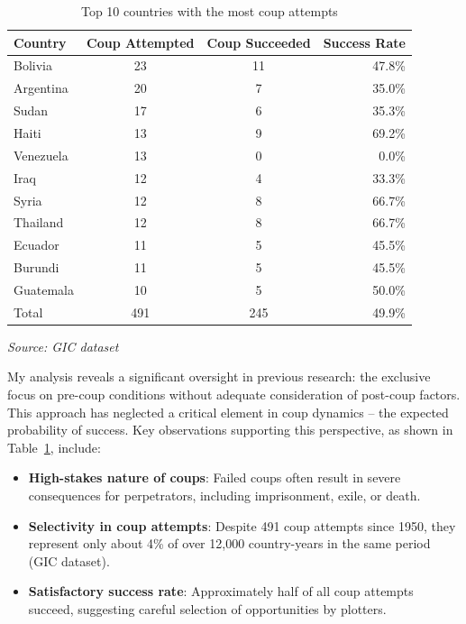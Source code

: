 \documentclass[
  12pt,
]{report}
\begin{document}
\begin{longtable}{@{\extracolsep{\fill}}lccr}

\caption{\label{tbl-coups}Top 10 countries with the most coup attempts}

\tabularnewline

\toprule
Country & Coup Attempted & Coup Succeeded & Success Rate \\ 
\midrule\addlinespace[2.5pt]
Bolivia & 23 & 11 & 47.8\% \\ 
Argentina & 20 & 7 & 35.0\% \\ 
Sudan & 17 & 6 & 35.3\% \\ 
Haiti & 13 & 9 & 69.2\% \\ 
Venezuela & 13 & 0 & 0.0\% \\ 
Iraq & 12 & 4 & 33.3\% \\ 
Syria & 12 & 8 & 66.7\% \\ 
Thailand & 12 & 8 & 66.7\% \\ 
Ecuador & 11 & 5 & 45.5\% \\ 
Burundi & 11 & 5 & 45.5\% \\ 
Guatemala & 10 & 5 & 50.0\% \\ 
Total & 491 & 245 & 49.9\% \\ 
\bottomrule

\end{longtable}

\begin{minipage}{\linewidth}
\emph{Source: GIC dataset}\\
\end{minipage}
\endgroup

My analysis reveals a significant oversight in previous research: the
exclusive focus on pre-coup conditions without adequate consideration of
post-coup factors. This approach has neglected a critical element in
coup dynamics -- the expected probability of success. Key observations
supporting this perspective, as shown in Table~\ref{tbl-coups}, include:

\begin{itemize}
\item
  \textbf{High-stakes nature of coups}: Failed coups often result in
  severe consequences for perpetrators, including imprisonment, exile,
  or death.
\item
  \textbf{Selectivity in coup attempts}: Despite 491 coup attempts since
  1950, they represent only about 4\% of over 12,000 country-years in
  the same period (GIC dataset).
\item
  \textbf{Satisfactory success rate}: Approximately half of all coup
  attempts succeed, suggesting careful selection of opportunities by
  plotters.
\end{itemize}
\end{document}
